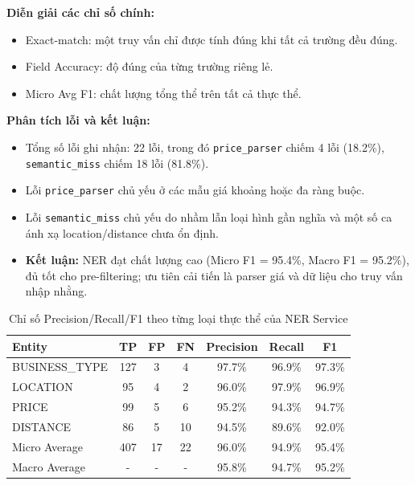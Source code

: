 \textbf{Diễn giải các chỉ số chính:}
\begin{itemize}
    \item Exact-match: một truy vấn chỉ được tính đúng khi tất cả trường đều đúng.
    \item Field Accuracy: độ đúng của từng trường riêng lẻ.
    \item Micro Avg F1: chất lượng tổng thể trên tất cả thực thể.
\end{itemize}

\textbf{Phân tích lỗi và kết luận:}

\begin{itemize}
    \item Tổng số lỗi ghi nhận: 22 lỗi, trong đó \texttt{price\_parser} chiếm 4 lỗi (18.2\%), \texttt{semantic\_miss} chiếm 18 lỗi (81.8\%).
    \item Lỗi \texttt{price\_parser} chủ yếu ở các mẫu giá khoảng hoặc đa ràng buộc.
    \item Lỗi \texttt{semantic\_miss} chủ yếu do nhầm lẫn loại hình gần nghĩa và một số ca ánh xạ location/distance chưa ổn định.
    \item \textbf{Kết luận:} NER đạt chất lượng cao (Micro F1 = 95.4\%, Macro F1 = 95.2\%), đủ tốt cho pre-filtering; ưu tiên cải tiến là parser giá và dữ liệu cho truy vấn nhập nhằng.
\end{itemize}

\begin{table}[H]
\centering
\begin{tabular}{|l|c|c|c|c|c|c|}
\hline
\textbf{Entity} & \textbf{TP} & \textbf{FP} & \textbf{FN} & \textbf{Precision} & \textbf{Recall} & \textbf{F1} \\
\hline
BUSINESS\_TYPE & 127 & 3 & 4 & 97.7\% & 96.9\% & 97.3\% \\
\hline
LOCATION & 95 & 4 & 2 & 96.0\% & 97.9\% & 96.9\% \\
\hline
PRICE & 99 & 5 & 6 & 95.2\% & 94.3\% & 94.7\% \\
\hline
DISTANCE & 86 & 5 & 10 & 94.5\% & 89.6\% & 92.0\% \\
\hline
Micro Average & 407 & 17 & 22 & 96.0\% & 94.9\% & 95.4\% \\
\hline
Macro Average & - & - & - & 95.8\% & 94.7\% & 95.2\% \\
\hline
\end{tabular}
\caption{Chỉ số Precision/Recall/F1 theo từng loại thực thể của NER Service}
\label{tab:ner_prf_metrics}
\end{table}

